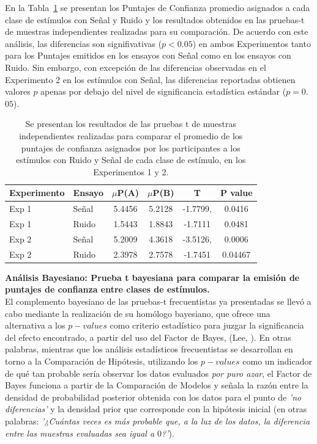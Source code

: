 En la Tabla~\ref{Tabla_t-Confidence} se presentan los Puntajes de Confianza promedio asignados a cada clase de estímulos con Señal y Ruido y los resultados obtenidos en las pruebas-t de muestras independientes realizadas para su comparación. De acuerdo con este análisis, las diferencias son signifivativas ($p<0.05$) en ambos Experimentos tanto para los Puntajes emitidos  en los ensayos con Señal como en los ensayos con Ruido. Sin embargo, con excepción de las diferencias observadas en el Experimento 2 en los estímulos con Señal, las diferencias reportadas obtienen valores $p$ apenas por debajo del nivel de significancia estadística estándar ($p=0$.$05$).\\

\begin{table}
\caption[Prueba T para evaluar diferencias en las medias de los puntajes de confianza asigandos entre condiciones]{Se presentan los resultados de las pruebas t de muestras independientes realizadas para comparar el promedio de los puntajes de confianza asignados por los participantes a los estímulos con Ruido y Señal de cada clase de estímulo, en los Experimentos 1 y 2.}
\label{Tabla_t-Confidence}
\centering
\begin{tabular}{l l |  c c c c}
\toprule
\textbf{Experimento} & \textbf{Ensayo} & \textbf{$\mu$P(A)} & \textbf{$\mu$P(B)} & \textbf{T} & \textbf{P value}\\
\midrule
Exp 1 & Señal & 5.4456 & 5.2128 & -1.7799, & 0.0416 \\
Exp 1 & Ruido & 1.5443 & 1.8843 & -1.7111 & 0.0481 \\
Exp 2 & Señal & 5.2009 & 4.3618  & -3.5126, & 0.0006 \\
Exp 2 & Ruido & 2.3978 & 2.7578 & -1.7451 & 0.04467 \\
\bottomrule
\end{tabular}
\end{table}

\textbf{Análisis Bayesiano: Prueba t bayesiana para comparar la emisión de puntajes de confianza entre clases de estímulos.}\\

El complemento bayesiano de las pruebas-t frecuentistas ya presentadas se llevó a cabo mediante la realización de su homólogo bayesiano, que ofrece una alternativa a los $p-values$ como criterio estadístico para juzgar la significancia del efecto encontrado, a partir del uso del Factor de Bayes, (Lee, \citeyear{Lee2016}). En otras palabras, mientras que los análisis estadísticos frecuentistas se desarrollan en torno a la Comparación de Hipótesis, utilizando los $p-values$ como un indicador de qué tan probable sería observar los datos evaluados \textit{por puro azar}, el Factor de Bayes funciona a partir de la Comparación de Modelos y señala la razón entre la densidad de probabilidad posterior obtenida con los datos para el punto de \textit{'no diferencias'} y la densidad prior que corresponde con la hipótesis inicial (en otras palabras: \textit{'¿Cuántas veces es más probable que, a la luz de los datos, la diferencia entre las muestras evaluadas sea igual a $0$?'}).\\

